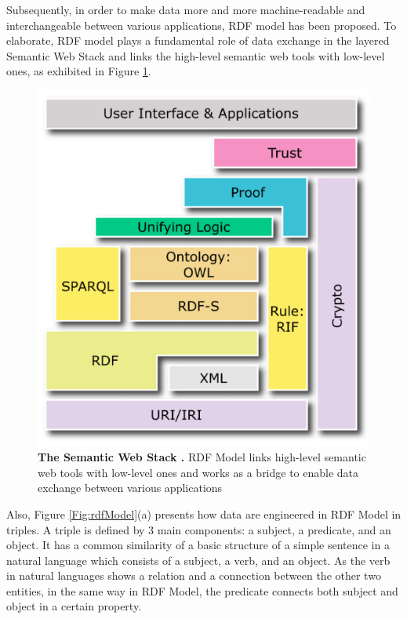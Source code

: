 Subsequently, in order to make data more and more machine-readable and interchangeable between various applications, RDF model \cite{W3C:RDF-Primer:Online} has been proposed.  To elaborate, RDF model plays a fundamental role of data exchange in the layered Semantic Web Stack and links the high-level semantic web tools with low-level ones, as exhibited in {Figure \ref{Fig:semanticWebStack}}. 
	\begin{figure}[ht]
	\begin{center}
	\setlength\belowcaptionskip{-7mm}
		\includegraphics[scale=0.5,angle=0]{images/semanticWebStack}
		\caption{\textbf{The Semantic Web Stack \cite{W3C:SemanticStack:Online}.} RDF Model links  high-level semantic web tools with low-level ones and works as a bridge to enable data exchange between various applications}
		\label{Fig:semanticWebStack}
	\end{center}
\end{figure}
\par
Also, {Figure \ref{Fig:rdfModel}}(a) presents how data are engineered in RDF Model in triples. A triple is defined by 3 main components: a subject, a predicate, and an object. It has a common similarity of a basic structure of a simple sentence in a natural language which consists of a subject, a verb, and  an object. As the verb in natural languages shows a relation and a connection between the other two entities, in the same way in RDF Model, the predicate connects both subject and object in a certain property. 

